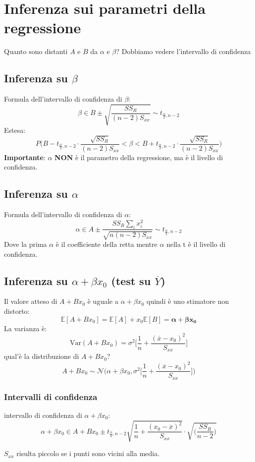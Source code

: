 \documentclass[]{article}
\newcommand{\ev}{\mathbb{E}[X]}
\renewcommand{\ev}[1]{\mathbb{E}\left[#1\right]}
\begin{document}
    \section{Inferenza sui parametri della regressione}
    Quanto sono distanti $A$ e $B$ da $\alpha$ e $\beta$?
    Dobbiamo vedere l'intervallo di confidenza
    \subsection{Inferenza su $\beta$}
    Formula dell'intervallo di confidenza di $\beta$:
    \[ \beta \in B \pm \sqrt{\frac{SS_R}{(n-2)S_{xx}}} \sim t_{\frac{\alpha}{2}, n-2} \]
    Estesa:
    \[ P\Big(B - t_{\frac{\alpha}{2},n-2} \cdot \frac{\sqrt{SS_R}}{(n-2)S_{xx}} < \beta < B + t_{\frac{\alpha}{2},n-2} \cdot \frac{\sqrt{SS_R}}{(n-2)S_{xx}}\Big) \]
    \textbf{Importante}: $\alpha$ \textbf{NON} è il parametro della regressione, ma è il livello di confidenza.
    \subsection{Inferenza su $\alpha$}
    Formula dell'intervallo di confidenza di $\alpha$:
    \[ \alpha \in A \pm \frac{SS_R\sum_{i}{}x_i^2}{\sqrt{n(n-2)S_{xx}}} \sim t_{\frac{\alpha}{2},n-2} \]
    Dove la prima $\alpha$ è il coefficiente della retta mentre $\alpha$ nella t è il livello di confidenza.
    \subsection{Inferenza su $\alpha + \beta x_0$ (test su $\overline{Y}$)}
    Il valore atteso di $A + B x_0$ è uguale a $\alpha + \beta x_0$  quindi è uno stimatore non distorto:
    \[ \ev{A +B x_0} = \ev{A} + x_0 \ev{B} = \boldsymbol{\alpha + \beta x_0} \]
    La varianza è:
    \[ \text{Var}(A+Bx_0) = \sigma^2 \Big[\frac{1}{n} + \frac{(\overline x - x_0)^2}{S_{xx}}  \Big] \]
    qual'è la distribuzione di $A+Bx_0$?
    \[ A+Bx_0 \sim \mathcal N \Big(\alpha+\beta x_0, \sigma^2 \Big[ \frac{1}{n} + \frac{(\overline x - x_0)^2}{S_{xx}} \Big]\Big) \]
    \subsubsection{Intervalli di confidenza}
    intervallo di confidenza di $\alpha + \beta x_0$:
    \[ \alpha + \beta x_0 \in A + B x_0 \pm t_{\frac{\alpha}{n}, n-2}\sqrt{\frac{1}{n} + \frac{(x_0- \overline x)^2}{S_{xx}}} \cdot \sqrt{\Big(\frac{SS_R}{n-2} \Big)} \]
    \centerline{$S_{xx}$ risulta piccolo se i punti sono vicini alla media.}
    \newpage
\end{document}

